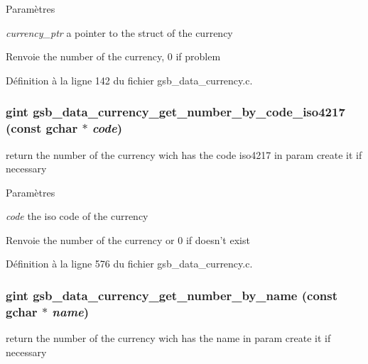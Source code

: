 \begin{DoxyParams}{Paramètres}
\item[{\em currency\_\-ptr}]a pointer to the struct of the currency\end{DoxyParams}
\begin{DoxyReturn}{Renvoie}
the number of the currency, 0 if problem 
\end{DoxyReturn}


Définition à la ligne 142 du fichier gsb\_\-data\_\-currency.c.

\subsubsection[{gsb\_\-data\_\-currency\_\-get\_\-number\_\-by\_\-code\_\-iso4217}]{\setlength{\rightskip}{0pt plus 5cm}gint gsb\_\-data\_\-currency\_\-get\_\-number\_\-by\_\-code\_\-iso4217 (const gchar $\ast$ {\em code})}\label{gsb__data__currency_8c_ad6f48bd7a2a3533c4be0f5453d2be28b}
return the number of the currency wich has the code iso4217 in param create it if necessary


\begin{DoxyParams}{Paramètres}
\item[{\em code}]the iso code of the currency\end{DoxyParams}
\begin{DoxyReturn}{Renvoie}
the number of the currency or 0 if doesn't exist 
\end{DoxyReturn}


Définition à la ligne 576 du fichier gsb\_\-data\_\-currency.c.

\subsubsection[{gsb\_\-data\_\-currency\_\-get\_\-number\_\-by\_\-name}]{\setlength{\rightskip}{0pt plus 5cm}gint gsb\_\-data\_\-currency\_\-get\_\-number\_\-by\_\-name (const gchar $\ast$ {\em name})}\label{gsb__data__currency_8c_a07a3bca074a1181fd741e4bb4ef1581b}
return the number of the currency wich has the name in param create it if necessary


